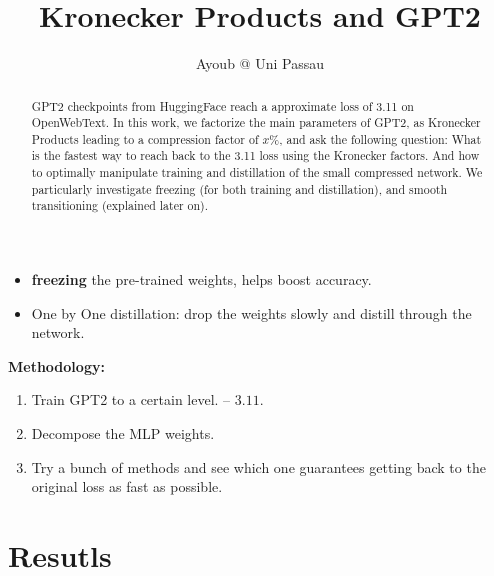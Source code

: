 \documentclass{article}
\title{Kronecker Products and GPT2}
\author{Ayoub @ Uni Passau}
\begin{document}
\maketitle

\begin{abstract}

	GPT2 checkpoints from HuggingFace reach a approximate loss of 3.11 on OpenWebText. 	In this work, we factorize the main parameters of GPT2, as Kronecker Products leading to a compression factor of $x\%$, and ask the following question:  What is the fastest way to reach back to the 3.11 loss using the Kronecker factors. And how to optimally manipulate training and distillation of the small compressed network. We particularly investigate freezing (for both training and distillation), and smooth transitioning (explained later on).


\end{abstract}

\begin{itemize}
	\item \textbf{freezing} the pre-trained weights, helps boost accuracy.
	\item One by One distillation: drop the weights slowly and distill through the network.
\end{itemize}

\textbf{Methodology:}
\begin{enumerate}
	\item Train GPT2 to a certain level. -- $3.11$.
	\item Decompose the MLP weights.
	\item Try a bunch of methods and see which one guarantees getting back to the original loss as fast as possible.
\end{enumerate}

\tableofcontents
\newpage

\section{Resutls}%
\label{sec:Resutls}
\end{document}

